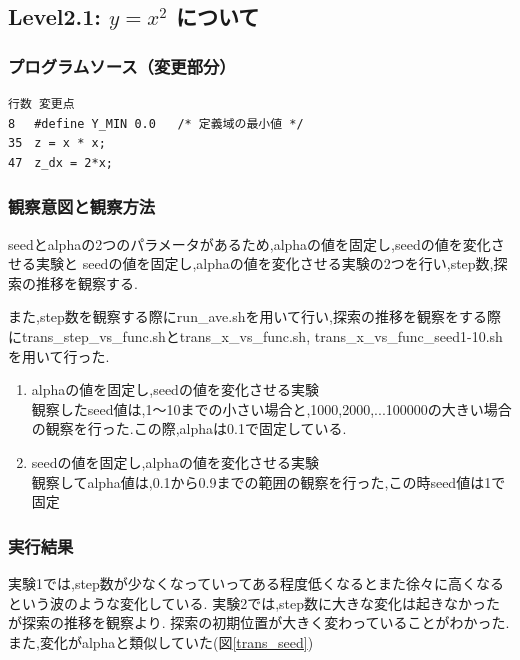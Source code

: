 \subsection{Level2.1: $y=x^2$ について}
\subsubsection{プログラムソース（変更部分）}
\begin{breakbox}
\begin{verbatim}
行数 変更点
8 　#define Y_MIN 0.0   /* 定義域の最小値 */
35　z = x * x;
47　z_dx = 2*x;
\end{verbatim}
\end{breakbox}

\subsubsection{観察意図と観察方法}
seedとalphaの2つのパラメータがあるため,alphaの値を固定し,seedの値を変化させる実験と
seedの値を固定し,alphaの値を変化させる実験の2つを行い,step数,探索の推移を観察する.

また,step数を観察する際にrun\_ave.shを用いて行い,探索の推移を観察をする際にtrans\_step\_vs\_func.shとtrans\_x\_vs\_func.sh,
trans\_x\_vs\_func\_seed1-10.shを用いて行った.\\

\begin{enumerate}
	\item  alphaの値を固定し,seedの値を変化させる実験\\
		観察したseed値は,1〜10までの小さい場合と,1000,2000,...100000の大きい場合の観察を行った.この際,alphaは0.1で固定している.
	\item seedの値を固定し,alphaの値を変化させる実験\\
		観察してalpha値は,0.1から0.9までの範囲の観察を行った,この時seed値は1で固定
\end{enumerate}

\subsubsection{実行結果}
実験1では,step数が少なくなっていってある程度低くなるとまた徐々に高くなるという波のような変化している.
実験2では,step数に大きな変化は起きなかったが探索の推移を観察より.
探索の初期位置が大きく変わっていることがわかった.
また,変化がalphaと類似していた(図\ref{trans_seed})

